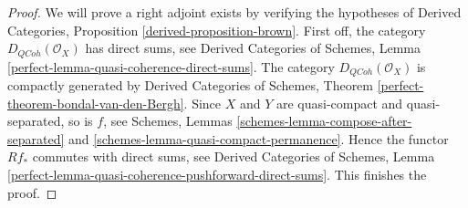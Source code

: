 \documentclass[10pt,a4paper]{amsart}
\theoremstyle{plain}
\theoremstyle{definition}
\theoremstyle{remark}
\numberwithin{equation}{subsection}
\def\QCoh{\mathit{QCoh}}
\begin{document}
\begin{proof}
We will prove a right adjoint exists by verifying the hypotheses of
Derived Categories, Proposition \ref{derived-proposition-brown}.
First off, the category $D_\QCoh(\mathcal{O}_X)$ has direct sums, see
Derived Categories of Schemes, Lemma
\ref{perfect-lemma-quasi-coherence-direct-sums}.
The category $D_\QCoh(\mathcal{O}_X)$ is compactly generated by
Derived Categories of Schemes, Theorem
\ref{perfect-theorem-bondal-van-den-Bergh}.
Since $X$ and $Y$ are quasi-compact and quasi-separated, so is $f$, see
Schemes, Lemmas \ref{schemes-lemma-compose-after-separated} and
\ref{schemes-lemma-quasi-compact-permanence}.
Hence the functor $Rf_*$ commutes with direct sums, see
Derived Categories of Schemes, Lemma
\ref{perfect-lemma-quasi-coherence-pushforward-direct-sums}.
This finishes the proof.
\end{proof}
\end{document}
